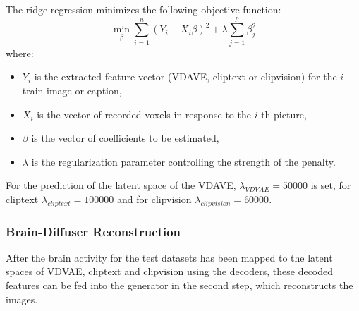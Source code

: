 The ridge regression minimizes the following objective function:
\[
\min_{\beta} \sum_{i=1}^{n} {(Y_i - X_i \beta)}^2 + \lambda \sum_{j=1}^{p} \beta_j^2
\]
where:
\begin{itemize}
    \item \(Y_i\) is the extracted feature-vector (VDAVE, cliptext or clipvision) for the \(i\)-train image or caption,
    \item \(X_i\) is the vector of recorded voxels in response to the \(i\)-th picture,
    \item \(\beta\) is the vector of coefficients to be estimated,
    \item \(\lambda\) is the regularization parameter controlling the strength of the penalty.
\end{itemize}

For the prediction of the latent space of the VDAVE, $\lambda_{VDVAE}=50000$ is set, for cliptext $\lambda_{cliptext}=100000$ and for clipvision $\lambda_{clipvision}=60000$. 

        

\subsubsection{Brain-Diffuser Reconstruction}
After the brain activity for the test datasets has been mapped to the latent spaces of VDVAE, cliptext and clipvision using the decoders, these decoded features can be fed into the generator in the second step, which reconstructs the images.

